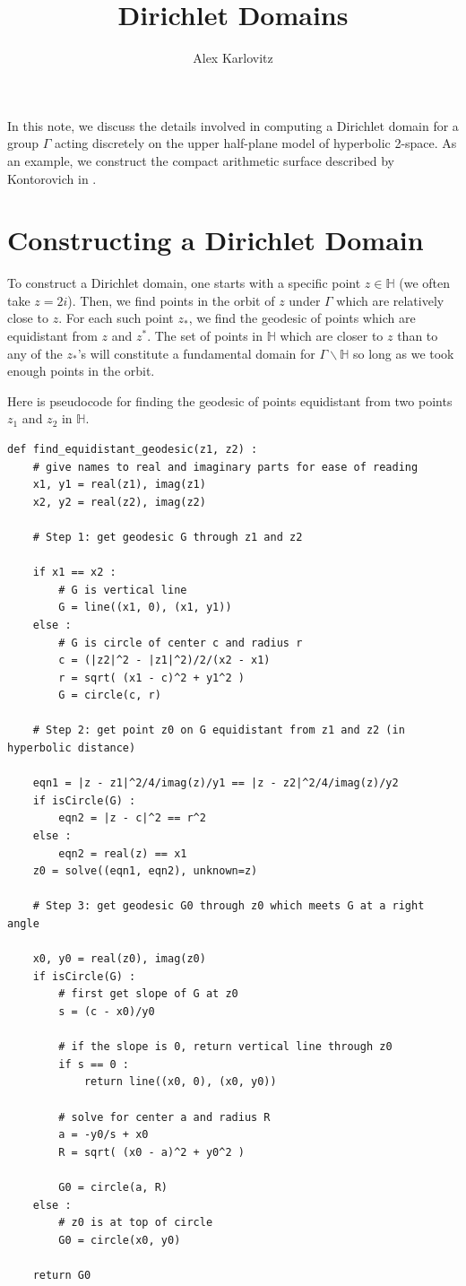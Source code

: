 \documentclass[]{article}
\title{Dirichlet Domains}
\author{Alex Karlovitz}
\date{}
\begin{document}
	
	\maketitle
	
In this note, we discuss the details involved in computing a Dirichlet domain for a group $\Gamma$ acting discretely on the upper half-plane model of hyperbolic 2-space.
As an example, we construct the compact arithmetic surface described by Kontorovich in \cite{kontorovich2011}.
	
\section*{Constructing a Dirichlet Domain}
	
To construct a Dirichlet domain, one starts with a specific point $z \in \mathbb{H}$ (we often take $z = 2i$).
Then, we find points in the orbit of $z$ under $\Gamma$ which are relatively close to $z$.
For each such point $z_*$, we find the geodesic of points which are equidistant from $z$ and $z^*$.
The set of points in $\mathbb{H}$ which are closer to $z$ than to any of the $z_*$'s will constitute a fundamental domain for $\Gamma\backslash\mathbb{H}$ so long as we took enough points in the orbit.

Here is pseudocode for finding the geodesic of points equidistant from two points $z_1$ and $z_2$ in $\mathbb{H}$.
\begin{verbatim}
def find_equidistant_geodesic(z1, z2) :
    # give names to real and imaginary parts for ease of reading
    x1, y1 = real(z1), imag(z1)
    x2, y2 = real(z2), imag(z2)

    # Step 1: get geodesic G through z1 and z2
    
    if x1 == x2 :
        # G is vertical line
        G = line((x1, 0), (x1, y1))
    else :
        # G is circle of center c and radius r
        c = (|z2|^2 - |z1|^2)/2/(x2 - x1)
        r = sqrt( (x1 - c)^2 + y1^2 )
        G = circle(c, r)
        
    # Step 2: get point z0 on G equidistant from z1 and z2 (in hyperbolic distance)
    
    eqn1 = |z - z1|^2/4/imag(z)/y1 == |z - z2|^2/4/imag(z)/y2
    if isCircle(G) :
        eqn2 = |z - c|^2 == r^2
    else :
        eqn2 = real(z) == x1
    z0 = solve((eqn1, eqn2), unknown=z)
    
    # Step 3: get geodesic G0 through z0 which meets G at a right angle
    
    x0, y0 = real(z0), imag(z0)
    if isCircle(G) :
        # first get slope of G at z0
        s = (c - x0)/y0
        
        # if the slope is 0, return vertical line through z0
        if s == 0 :
            return line((x0, 0), (x0, y0))
        
        # solve for center a and radius R
        a = -y0/s + x0
        R = sqrt( (x0 - a)^2 + y0^2 )
        
        G0 = circle(a, R)
    else :
        # z0 is at top of circle
        G0 = circle(x0, y0)
        
    return G0
\end{verbatim}
\end{document}
